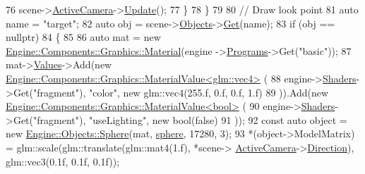 \begin{DoxyCode}
{76             scene->\mbox{\hyperlink{classEngine_1_1Components_1_1Scene_a9408befee37d89e2c001d25b9e4ed75a}{ActiveCamera}}->\mbox{\hyperlink{classEngine_1_1Components_1_1Camera_a364f5e22921e3d234b31297a64c7d932}{Update}}();
77         \}
78     \}
79 
80     \textcolor{comment}{// Draw look point}
81     \textcolor{keyword}{auto} name = \textcolor{stringliteral}{"target"};
82     \textcolor{keyword}{auto} obj = scene->\mbox{\hyperlink{classEngine_1_1Components_1_1Scene_a23481feabaaa56bf5613765db03af4da}{Objects}}->\mbox{\hyperlink{classGeneric_1_1Dictionary_ad018bc166486129b48e9ededce313984}{Get}}(name);
83     \textcolor{keywordflow}{if} (obj == \textcolor{keyword}{nullptr})
84     \{
85 
86         \textcolor{keyword}{auto} mat = \textcolor{keyword}{new} \mbox{\hyperlink{classEngine_1_1Components_1_1Graphics_1_1Material}{Engine::Components::Graphics::Material}}(engine
      ->\mbox{\hyperlink{classEngine_1_1BaseEngine_ae0f86360ea3a384caefe443dd8f88601}{Programs}}->Get(\textcolor{stringliteral}{"basic"}));
87         mat->\mbox{\hyperlink{classEngine_1_1Components_1_1Graphics_1_1Material_a34335608ba1e6eb2c2dba5032107eab0}{Values}}->Add(\textcolor{keyword}{new} 
      \mbox{\hyperlink{classEngine_1_1Components_1_1Graphics_1_1MaterialValue}{Engine::Components::Graphics::MaterialValue<glm::vec4>}}
      (
88             engine->\mbox{\hyperlink{classEngine_1_1BaseEngine_a2582dee3f73da82bb422b43317b85e3b}{Shaders}}->Get(\textcolor{stringliteral}{"fragment"}), \textcolor{stringliteral}{"color"}, \textcolor{keyword}{new} glm::vec4(255.f, 0.f, 0.f, 1.f)
89         )).Add(\textcolor{keyword}{new} \mbox{\hyperlink{classEngine_1_1Components_1_1Graphics_1_1MaterialValue}{Engine::Components::Graphics::MaterialValue<bool>}}
      (
90             engine->\mbox{\hyperlink{classEngine_1_1BaseEngine_a2582dee3f73da82bb422b43317b85e3b}{Shaders}}->Get(\textcolor{stringliteral}{"fragment"}), \textcolor{stringliteral}{"useLighting"}, \textcolor{keyword}{new} bool(\textcolor{keyword}{false})
91         ));
92         \textcolor{keyword}{const} \textcolor{keyword}{auto} \textcolor{keywordtype}{object} = \textcolor{keyword}{new} \mbox{\hyperlink{classEngine_1_1Objects_1_1Sphere}{Engine::Objects::Sphere}}(mat, 
      \mbox{\hyperlink{2_2sphere_8h_a3663362197033eb86a9dcecea5a9d25f}{sphere}}, 17280, 3);
93         *(\textcolor{keywordtype}{object}->ModelMatrix) = glm::scale(glm::translate(glm::mat4(1.f), *scene->
      \mbox{\hyperlink{classEngine_1_1Components_1_1Scene_a9408befee37d89e2c001d25b9e4ed75a}{ActiveCamera}}->\mbox{\hyperlink{classEngine_1_1Components_1_1Camera_a23619a66046258f1158313f0c790ffa2}{Direction}}), glm::vec3(0.1f, 0.1f, 0.1f));
}
\end{DoxyCode}
